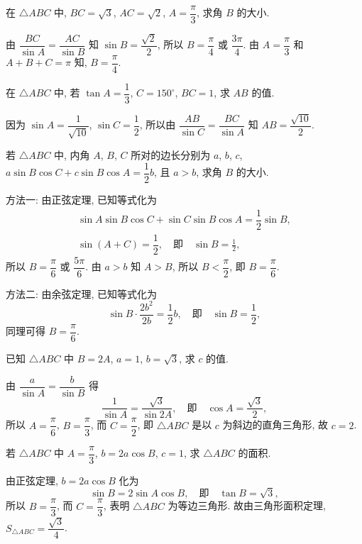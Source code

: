 \begin{exercise}
    在 $\triangle ABC$ 中, $BC=\sqrt3$, $AC=\sqrt2$, $A=\dfrac\pi3$, 
    求角 $B$ 的大小.
\end{exercise}
\beginsolution
    由 $\dfrac{BC}{\sin A}= \dfrac{AC}{\sin B}$ 
    知 $\sin B= \dfrac{\sqrt2}{2}$, 所以 $B= \dfrac\pi4$ 或 $\dfrac{3\pi}{4}$. 由 $A= \dfrac\pi3$ 和 $A+B+C=\pi$ 知, $B= \dfrac\pi4$.
\endsolution

\begin{exercise}
    在 $\triangle ABC$ 中, 若 $\tan A=\dfrac13$, $C=150^\circ$, $BC=1$, 求 $AB$ 的值.
\end{exercise}
\beginsolution
    因为 $\sin A= \dfrac1{\sqrt{10}}$, $\sin C= \dfrac12$, 所以由 $\dfrac{AB}{\sin C}= \dfrac{BC}{\sin A}$ 知 $AB= \dfrac{\sqrt{10}}{2}$.
\endsolution

\begin{exercise}
    若 $\triangle ABC$ 中, 内角 $A$, $B$, $C$ 所对的边长分别为 
    $a$, $b$, $c$, $a\sin B\cos C+c\sin B\cos A= \dfrac12 b$,
    且 $a>b$, 求角 $B$ 的大小.
\end{exercise}
\beginsolution
    方法一: 由正弦定理, 已知等式化为
    \[\begin{gathered}
        \sin A\sin B\cos C+ \sin C\sin B\cos A= \dfrac12 \sin B,\\
        \sin(A+C)= \dfrac12,\quad\text{即}\quad
        \sin B=\frac12,
    \end{gathered}\]
    所以 $B=\dfrac\pi6$ 或 $\dfrac{5\pi}{6}$. 由 $a>b$ 知 $A>B$, 所以 $B< \dfrac\pi2$, 即 $B= \dfrac\pi6$.

    方法二: 由余弦定理, 已知等式化为
    \[\sin B\cdot \frac{2b^2}{2b}= \frac12b,\quad\text{即}\quad
        \sin B=\frac12,\]
    同理可得 $B= \dfrac\pi6$.
\endsolution

\begin{exercise}
    已知 $\triangle ABC$ 中 $B=2A$, $a=1$, $b=\sqrt3$, 求 $c$ 的值.
\end{exercise}
\beginsolution
    由 $\dfrac{a}{\sin A}= \dfrac{b}{\sin B}$ 得
    \[\frac1{\sin A}= \frac{\sqrt3}{\sin 2A},\quad\text{即}\quad
        \cos A= \dfrac{\sqrt3}{2},\]
    所以 $A=\dfrac\pi6$, $B=\dfrac\pi3$, 而 $C=\dfrac\pi2$, 即 $\triangle ABC$ 是以 $c$ 为斜边的直角三角形, 故 $c=2$.
\endsolution

\begin{exercise}
    若 $\triangle ABC$ 中 $A= \dfrac\pi3$, $b=2a\cos B$, $c=1$, 
    求 $\triangle ABC$ 的面积.
\end{exercise}
\beginsolution
    由正弦定理, $b=2a\cos B$ 化为
    \[\sin B= 2\sin A\cos B,\quad\text{即}\quad
        \tan B= \sqrt3,\]
    所以 $B= \dfrac\pi3$, 而 $C=\dfrac\pi3$, 
    表明 $\triangle ABC$ 为等边三角形. 故由三角形面积定理, $S_{\triangle ABC}= \dfrac{\sqrt3}{4}$.
\endsolution

